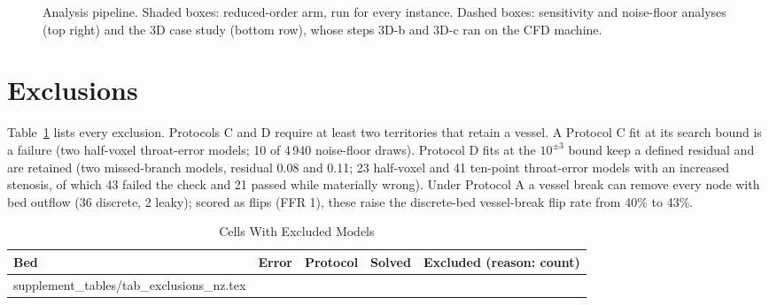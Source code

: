\documentclass[journal,twoside,web,onecolumn]{ieeecolor}
\begin{document}
\begin{figure}[!h]
\caption{Analysis pipeline. Shaded boxes: reduced-order arm, run for every
instance. Dashed boxes: sensitivity and noise-floor analyses (top right) and the 3D case study (bottom row), whose
steps 3D-b and 3D-c ran on the CFD machine.}\label{fig:pipeline}
\end{figure}

\FloatBarrier
{}
\section{Exclusions}
Table~\ref{tab:excl} lists every exclusion. Protocols C and D require at least two territories that retain a
vessel. A Protocol C fit at its search bound is a failure (two half-voxel throat-error models; 10 of 4\,940
noise-floor draws). Protocol D fits at the $10^{\pm 3}$ bound keep a defined residual and are retained (two
missed-branch models, residual 0.08 and 0.11; 23 half-voxel and 41 ten-point throat-error models with an increased stenosis, of which 43 failed the check and 21
passed while materially wrong).
Under Protocol A a vessel break can remove every node with bed outflow (36 discrete, 2 leaky); scored as flips (FFR 1),
these raise the discrete-bed vessel-break flip rate from 40\% to 43\%.
\begin{table}[!ht]
\caption{Cells With Excluded Models}\label{tab:excl}
\centering\footnotesize
\begin{tabular}{@{}lllrl@{}}
\toprule
Bed & Error & Protocol & Solved & Excluded (reason: count)\\
\midrule
{} supplement_tables/tab_exclusions_nz.tex 
\bottomrule
\end{tabular}
\end{table}
\end{document}
